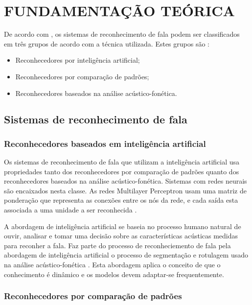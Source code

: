 \chapter{FUNDAMENTAÇÃO TEÓRICA}
\label{chap:referencial_teorico}
\thispagestyle{plain}
De acordo com \cite{fundRecFala}, os  sistemas de reconhecimento de fala podem ser classificados em três grupos de acordo com a técnica utilizada. Estes grupos são :
\begin{itemize}
\item Reconhecedores por inteligência artificial;
\item Reconhecedores por comparação de padrões;
\item Reconhecedores baseados na análise acústico-fonética.
\end{itemize}
\section{Sistemas de reconhecimento de fala }

\label{sec:sistemasdereconhecimentodefala}


\subsection{Reconhecedores baseados em inteligência artificial}

Os sistemas de reconhecimento de fala que utilizam a inteligência artificial usa propriedades tanto dos reconhecedores por comparação de padrões quanto dos reconhecedores baseados na análise acústico-fonética. Sistemas com redes neurais são encaixados nesta classe. As redes Multilayer Perceptron usam uma matriz de ponderação que representa as conexões entre os nós da rede, e cada saída esta associada a uma unidade a ser reconhecida \cite{kluwerNeural}.

A abordagem de inteligência artificial se baseia no processo humano natural de ouvir, analisar e tomar uma decisão sobre as características acústicas medidas para reconher a fala. Faz parte do processo de reconheciemento de fala pela abordagem de inteligência artificial o processo de segmentação e rotulagem usado na análise acústico-fonética  \cite{fundRecFala}. Esta abordagem aplica o conceito de que o conhecimento é dinâmico  e os modelos devem adaptar-se frequentemente. 

\subsection{Reconhecedores por comparação de padrões}


